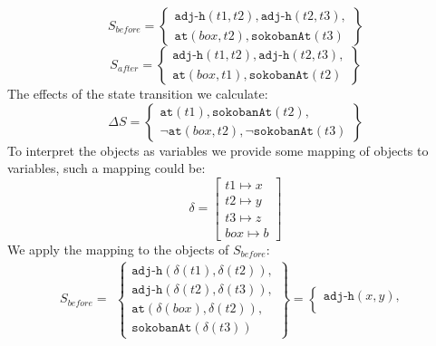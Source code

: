 \documentclass[../Master.tex]{subfiles}
\begin{document}
\begin{thm-sokoban-example-initial-precond}
\begin{equation*}\label{eq:s_before}
S_{before} =
	\left\{
		\begin{gathered}
			\texttt{adj-h}(t1, t2), \texttt{adj-h}(t2, t3), \\
			\texttt{at}(box,t2), \texttt{sokobanAt}(t3)
		\end{gathered}
	\right\}
\end{equation*}
\begin{equation*}
S_{after} =
	\left\{
		\begin{gathered}
			\texttt{adj-h}(t1, t2), \texttt{adj-h}(t2, t3), \\
			\texttt{at}(box,t1), \texttt{sokobanAt}(t2)
		\end{gathered}
	\right\}
\end{equation*}
The effects of the state transition we calculate:
\begin{equation*}
\Delta S =
	\left\{
		\begin{gathered}
			\texttt{at}(t1), \texttt{sokobanAt}(t2), \\
			\neg\texttt{at}(box,t2), \neg\texttt{sokobanAt}(t3)
		\end{gathered}
	\right\}
\end{equation*}
To interpret the objects as variables we provide some mapping of objects to variables, such a mapping could be:
\begin{equation*}
\delta =
	\left [
		\begin{gathered}
			t1 \mapsto x \\
			t2 \mapsto y \\
			t3 \mapsto z \\
			box \mapsto b
		\end{gathered}
	\right ]
\end{equation*}
We apply the mapping to the objects of $S_{before}$:
\begin{equation*}
	S_{before} = 
	\begin{gathered}
		\left\{
			\begin{gathered}
				\texttt{adj-h}(\delta (t1), \delta (t2)), \\
				\texttt{adj-h}(\delta (t2), \delta (t3)), \\
				\texttt{at}(\delta (box),\delta (t2)), \\
				 \texttt{sokobanAt}(\delta (t3))
			\end{gathered}
		\right\} 
		=
		\left\{
			\begin{gathered}
				\texttt{adj-h}(x, y), \\

\end{gathered}
\end{gathered}
\end{equation*}
\end{thm-sokoban-example-initial-precond}
\end{document}
